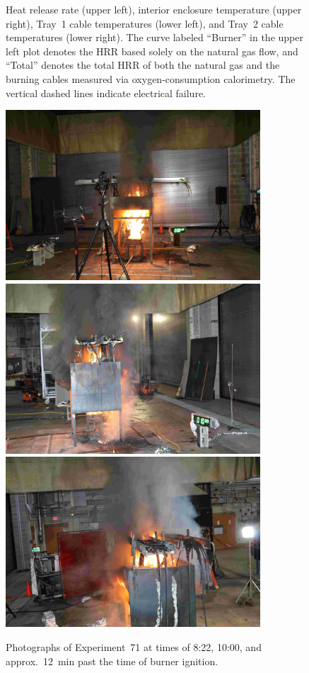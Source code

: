 \begin{figure}[H]
\caption[HRR and temperatures of Experiment 71]{Heat release rate (upper left), interior enclosure temperature (upper right), Tray~1 cable temperatures (lower left), and Tray~2 cable temperatures (lower right). The curve labeled ``Burner'' in the upper left plot denotes the HRR based solely on the natural gas flow, and ``Total'' denotes the total HRR of both the natural gas and the burning cables measured via oxygen-consumption calorimetry. The vertical dashed lines indicate electrical failure.}
\label{fig:Test_71}
\end{figure}

\begin{figure}[p]
\centering
\includegraphics[height=2.50in]{../FIGURES/Test_71_Photo_1} \\ \vspace{0.1in}
\includegraphics[height=2.50in]{../FIGURES/Test_71_Photo_2} \\ \vspace{0.1in}
\includegraphics[height=2.50in]{../FIGURES/Test_71_Photo_3}
\caption[Photographs of Experiment~71]{Photographs of Experiment~71 at times of 8:22, 10:00, and approx.~12~min past the time of burner ignition.}
\label{fig:Test_71_photos}
\end{figure}



